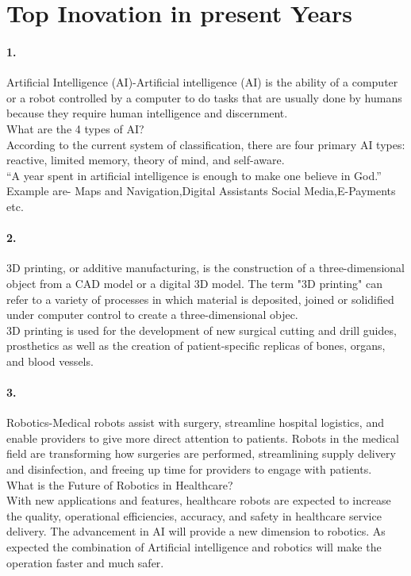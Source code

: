 \documentclass[12pt]{report}
\begin{document}
\section{Top Inovation in present Years}\paragraph{1.}
Artificial Intelligence (AI)-Artificial intelligence (AI) is the ability of a computer or a robot controlled by a computer to do tasks that are usually done by humans because they require human intelligence and discernment.\\
What are the 4 types of AI?\\
According to the current system of classification, there are four primary AI types: reactive, limited memory, theory of mind, and self-aware.\\
“A year spent in artificial intelligence is enough to make one believe in God.”\\
Example are-  Maps and Navigation,Digital Assistants Social Media,E-Payments etc.\paragraph{2.}
3D printing, or additive manufacturing, is the construction of a three-dimensional object from a CAD model or a digital 3D model. The term "3D printing" can refer to a variety of processes in which material is deposited, joined or solidified under computer control to create a three-dimensional objec.\\3D printing is used for the development of new surgical cutting and drill guides, prosthetics as well as the creation of patient-specific replicas of bones, organs, and blood vessels.\paragraph{3.}
Robotics-Medical robots assist with surgery, streamline hospital logistics, and enable providers to give more direct attention to patients. Robots in the medical field are transforming how surgeries are performed, streamlining supply delivery and disinfection, and freeing up time for providers to engage with patients.\\
What is the Future of Robotics in Healthcare?\\
With new applications and features, healthcare robots are expected to increase the quality, operational efficiencies, accuracy, and safety in healthcare service delivery. The advancement in AI will provide a new dimension to robotics. As expected the combination of Artificial intelligence and robotics will make the operation faster and much safer.
\clearpage 
\end{document}
